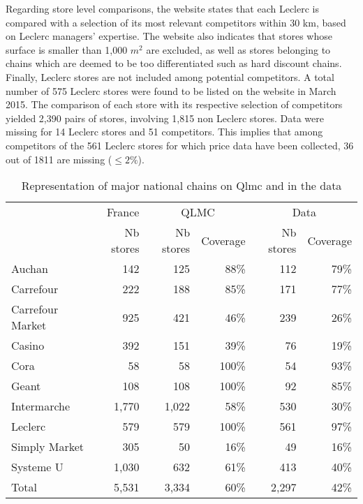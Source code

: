 \documentclass[english]{article}
\begin{document}
Regarding store level comparisons, the website states that each Leclerc is compared with a selection of its most relevant competitors within 30 km, based on Leclerc managers' expertise. The website also indicates that stores whose surface is smaller than 1,000 $m^2$ are excluded, as well as stores belonging to chains which are deemed to be too differentiated such as hard discount chains. Finally, Leclerc stores are not included among potential competitors. A total number of 575 Leclerc stores were found to be listed on the website in March 2015. The comparison of each store with its respective selection of competitors yielded 2,390 pairs of stores, involving 1,815 non Leclerc stores. Data were missing for 14 Leclerc stores and 51 competitors. This implies that among competitors of the 561 Leclerc stores for which price data have been collected, 36 out of 1811 are missing ($\le 2 \%$).

\begin{table}
\caption{Representation of major national chains on Qlmc and in the data}
\label{tab:qlmc_chain_repr}
\begin{threeparttable}
\begin{tabular}{lr|rr|rr}
\toprule
\toprule
          & France & \multicolumn{2}{c|}{QLMC} & \multicolumn{2}{c}{Data} \\
          & Nb stores & Nb stores & Coverage & Nb stores & Coverage \\
\midrule
    Auchan & 142   & 125   & 88\%  & 112   & 79\% \\
    Carrefour & 222   & 188   & 85\%  & 171   & 77\% \\
    Carrefour Market & 925   & 421   & 46\%  & 239   & 26\% \\
    Casino & 392   & 151   & 39\%  & 76    & 19\% \\
    Cora  & 58    & 58    & 100\% & 54    & 93\% \\
    Geant & 108   & 108   & 100\% & 92    & 85\% \\
    Intermarche & 1,770 & 1,022 & 58\%  & 530   & 30\% \\
    Leclerc & 579   & 579   & 100\% & 561   & 97\% \\
    Simply Market & 305   & 50    & 16\%  & 49    & 16\% \\
    Systeme U & 1,030 & 632   & 61\%  & 413   & 40\% \\
\midrule		
    Total & 5,531 & 3,334 & 60\%  & 2,297 & 42\% \\
\bottomrule
\bottomrule
\end{tabular}
\end{threeparttable}
\end{table}
\end{document}
